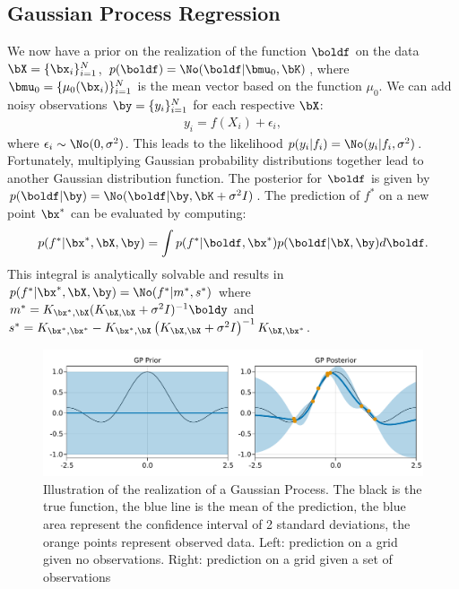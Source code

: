 \subsection{Gaussian Process Regression}

We now have a prior on the realization of the function $\boldf$ on the data $\bX = \{\bx_i\}_{i=1}^N$, $p(\boldf) = \No(\boldf|\bmu_0, \bK)$, where $\bmu_0 = \{\mu_0(\bx_i)\}_{i=1}^N$ is the mean vector based on the function $\mu_0$.
We can add noisy observations $\by = \{y_i\}_{i=1}^N$ for each respective $\bX$:
\begin{align}
y_i = f(X_i) + \epsilon_i,
\end{align}
where $\epsilon_i \sim \No(0,\sigma^2)$.
This leads to the likelihood $p(y_i|f_i) = \No(y_i|f_i, \sigma^2)$.
Fortunately, multiplying Gaussian probability distributions together lead to another Gaussian distribution function.
The posterior for $\boldf$ is given by $p(\boldf|\by) = \No(\boldf|\by, \bK + \sigma^2 I)$.
The prediction of $f^*$ on a new point $\bx^*$ can be evaluated by computing:
\begin{align}
p(f^*|\bx^*,\bX,\by) = \int p(f^*|\boldf,\bx^*)p(\boldf|\bX,\by)d\boldf.
\end{align}	
This integral is analytically solvable and results in $p(f^*|\bx^*,\bX,\by)=\No(f^*|m^*,s^*)$ where $m^* = K_{\bx^*,\bX}(K_{\bX,\bX} + \sigma^{2}I)^{-1}\boldy$ and $s^*=K_{\bx^*,\bx^*} - K_{\bx^*,\bX}\left(K_{\bX,\bX}+\sigma^2I\right)^{-1}K_{\bX,\bx^*}$.

\begin{figure}
    \includegraphics[width=\textwidth]{./chapters/2_background/figures/GP_example.pdf}
    \caption{Illustration of the realization of a Gaussian Process. The black is the true function, the blue line is the mean of the prediction, the blue area represent the confidence interval of 2 standard deviations, the orange points represent observed data. Left: prediction on a grid given no observations. Right: prediction on a grid given a set of observations}
    \label{fig:gp_example}
\end{figure}

